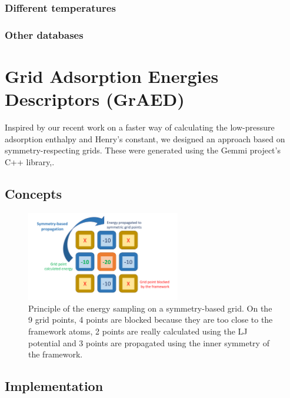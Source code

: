 \documentclass[main]{subfiles}
\begin{document}
\subsubsection{Different temperatures}

\subsubsection{Other databases}

\section{Grid Adsorption Energies Descriptors (GrAED)}

Inspired by our recent work on a faster way of calculating the low-pressure adsorption enthalpy and Henry's constant,\cite{Ren_2023} we designed an approach based on symmetry-respecting grids. These were generated using the Gemmi project's C++ library,\cite{Wojdyr_2022}. 


\subsection{Concepts}


\begin{figure}[ht]
  \centering
    \includegraphics[width=0.6\textwidth]{figures/3-fastsim/grid_sampling.pdf}
    \caption{Principle of the energy sampling on a symmetry-based grid. On the 9 grid points, 4 points are blocked because they are too close to the framework atoms, 2 points are really calculated using the LJ potential and 3 points are propagated using the inner symmetry of the framework.}\label{fgr:principle_grid}
\end{figure}

\subsection{Implementation}
\end{document}
